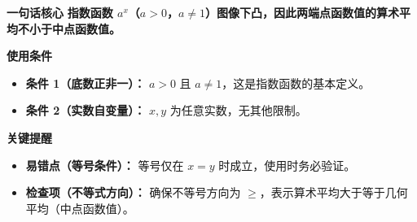 \begin{summarybox}
\textbf{\textcolor{CSummary}{一句话核心}}
\textbf{指数函数 $a^{x}$（$a>0$，$a\neq 1$）图像下凸，因此两端点函数值的算术平均不小于中点函数值。}

\medskip
\textbf{\textcolor{CSummary}{使用条件}}
\begin{itemize}[leftmargin=*, itemsep=0.5em, topsep=0.4em]
    \item \textbf{条件 1（底数正非一）：} $a>0$ 且 $a\neq 1$，这是指数函数的基本定义。
    \item \textbf{条件 2（实数自变量）：} $x,y$ 为任意实数，无其他限制。
\end{itemize}

\medskip
\textbf{\textcolor{CSummary}{关键提醒}}
\begin{itemize}[leftmargin=*, itemsep=0.5em, topsep=0.4em]
    \item \textbf{易错点（等号条件）：} 等号仅在 $x=y$ 时成立，使用时务必验证。
    \item \textbf{检查项（不等式方向）：} 确保不等号方向为 $\geq$，表示算术平均大于等于几何平均（中点函数值）。
\end{itemize}
\end{summarybox}
